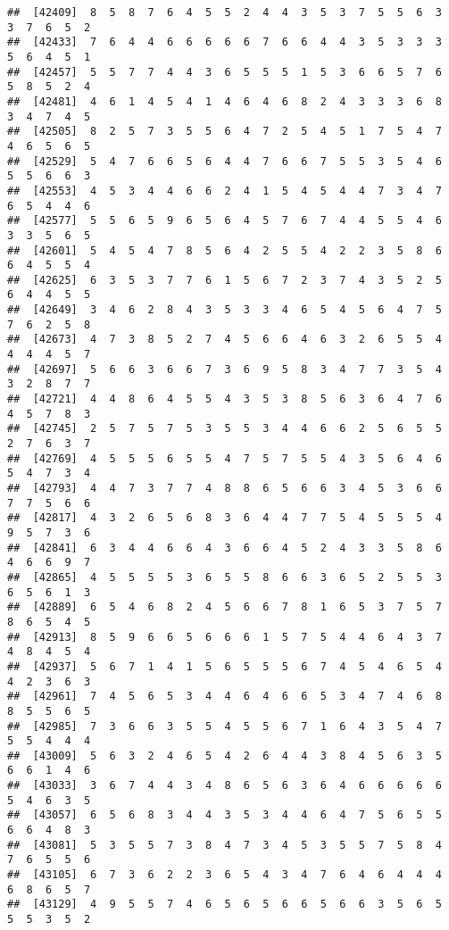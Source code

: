 \documentclass[
]{book}
\begin{document}
\begin{verbatim}
##  [42409]  8  5  8  7  6  4  5  5  2  4  4  3  5  3  7  5  5  6  3  3  7  6  5  2
##  [42433]  7  6  4  4  6  6  6  6  6  7  6  6  4  4  3  5  3  3  3  5  6  4  5  1
##  [42457]  5  5  7  7  4  4  3  6  5  5  5  1  5  3  6  6  5  7  6  5  8  5  2  4
##  [42481]  4  6  1  4  5  4  1  4  6  4  6  8  2  4  3  3  3  6  8  3  4  7  4  5
##  [42505]  8  2  5  7  3  5  5  6  4  7  2  5  4  5  1  7  5  4  7  4  6  5  6  5
##  [42529]  5  4  7  6  6  5  6  4  4  7  6  6  7  5  5  3  5  4  6  5  5  6  6  3
##  [42553]  4  5  3  4  4  6  6  2  4  1  5  4  5  4  4  7  3  4  7  6  5  4  4  6
##  [42577]  5  5  6  5  9  6  5  6  4  5  7  6  7  4  4  5  5  4  6  3  3  5  6  5
##  [42601]  5  4  5  4  7  8  5  6  4  2  5  5  4  2  2  3  5  8  6  6  4  5  5  4
##  [42625]  6  3  5  3  7  7  6  1  5  6  7  2  3  7  4  3  5  2  5  6  4  4  5  5
##  [42649]  3  4  6  2  8  4  3  5  3  3  4  6  5  4  5  6  4  7  5  7  6  2  5  8
##  [42673]  4  7  3  8  5  2  7  4  5  6  6  4  6  3  2  6  5  5  4  4  4  4  5  7
##  [42697]  5  6  6  3  6  6  7  3  6  9  5  8  3  4  7  7  3  5  4  3  2  8  7  7
##  [42721]  4  4  8  6  4  5  5  4  3  5  3  8  5  6  3  6  4  7  6  4  5  7  8  3
##  [42745]  2  5  7  5  7  5  3  5  5  3  4  4  6  6  2  5  6  5  5  2  7  6  3  7
##  [42769]  4  5  5  5  6  5  5  4  7  5  7  5  5  4  3  5  6  4  6  5  4  7  3  4
##  [42793]  4  4  7  3  7  7  4  8  8  6  5  6  6  3  4  5  3  6  6  7  7  5  6  6
##  [42817]  4  3  2  6  5  6  8  3  6  4  4  7  7  5  4  5  5  5  4  9  5  7  3  6
##  [42841]  6  3  4  4  6  6  4  3  6  6  4  5  2  4  3  3  5  8  6  4  6  6  9  7
##  [42865]  4  5  5  5  5  3  6  5  5  8  6  6  3  6  5  2  5  5  3  6  5  6  1  3
##  [42889]  6  5  4  6  8  2  4  5  6  6  7  8  1  6  5  3  7  5  7  8  6  5  4  5
##  [42913]  8  5  9  6  6  5  6  6  6  1  5  7  5  4  4  6  4  3  7  4  8  4  5  4
##  [42937]  5  6  7  1  4  1  5  6  5  5  5  6  7  4  5  4  6  5  4  4  2  3  6  3
##  [42961]  7  4  5  6  5  3  4  4  6  4  6  6  5  3  4  7  4  6  8  8  5  5  6  5
##  [42985]  7  3  6  6  3  5  5  4  5  5  6  7  1  6  4  3  5  4  7  5  5  4  4  4
##  [43009]  5  6  3  2  4  6  5  4  2  6  4  4  3  8  4  5  6  3  5  6  6  1  4  6
##  [43033]  3  6  7  4  4  3  4  8  6  5  6  3  6  4  6  6  6  6  6  5  4  6  3  5
##  [43057]  6  5  6  8  3  4  4  3  5  3  4  4  6  4  7  5  6  5  5  6  6  4  8  3
##  [43081]  5  3  5  5  7  3  8  4  7  3  4  5  3  5  5  7  5  8  4  7  6  5  5  6
##  [43105]  6  7  3  6  2  2  3  6  5  4  3  4  7  6  4  6  4  4  4  6  8  6  5  7
##  [43129]  4  9  5  5  7  4  6  5  6  5  6  6  5  6  6  3  5  6  5  5  5  3  5  2

\end{verbatim}
\end{document}

